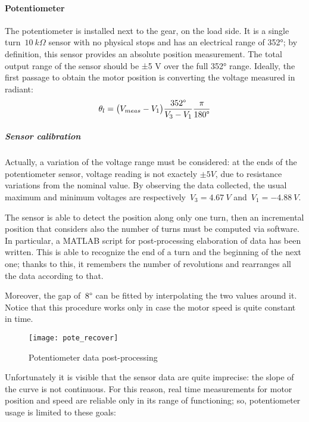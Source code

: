 \paragraph{Potentiometer}
The potentiometer is installed next to the gear, on the load side. It is a single turn~$10 \ k\Omega$ sensor with no physical stops and has an electrical range of 352°; by definition, this sensor provides an absolute position measurement.
The total output range of the sensor should be ±5 V over the full 352° range.
Ideally, the first passage to obtain the motor position is converting the voltage measured in radiant:
\[
	\theta_l = \bigl{(} V_{meas} - V_1 \bigr{)} \frac{352 \degree }{V_3 - V_1} \frac{\pi}{180 \degree }
\]

\subparagraph{Sensor calibration}
Actually, a variation of the voltage range must be considered: at the ends of the potentiometer sensor, voltage reading is not exactely $\pm 5V$, due to resistance variations from the nominal value. By observing the data collected, the usual maximum and minimum voltages are respectively~$V_3=4.67 \ V$ and~$V_1=-4.88 \ V$.

The sensor is able to detect the position along only one turn, then an incremental position that considers also the number of turns must be computed via software.
In particular, a MATLAB script for post-processing elaboration of data has been written. This is able to recognize the end of a turn and the beginning of the next one; thanks to this, it remembers the number of revolutions and rearranges all the data according to that.

Moreover, the gap of~$8 \degree$ can be fitted by interpolating the two values around it. Notice that this procedure works only in case the motor speed is quite constant in time.
\begin{figure*}[h]
	\centering
	\texttt{[image: pote\_recover]}
	\caption{Potentiometer data post-processing}
\end{figure*}

Unfortunately it is visible that the sensor data are quite imprecise: the slope of the curve is not continuous. For this reason, real time measurements for motor position and speed are reliable only in its range of functioning; so, potentiometer usage is limited to these goals:

